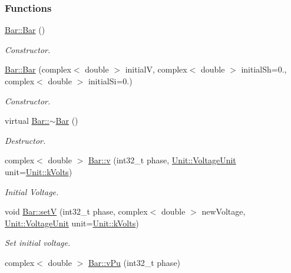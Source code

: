\subsubsection*{Functions}
\begin{DoxyCompactItemize}
\item 
\hyperlink{group___models_ga9cae2188fcc6cce41caa7898c64548d1}{Bar\+::\+Bar} ()
\begin{DoxyCompactList}\small\item\em Constructor. \end{DoxyCompactList}\item 
\hyperlink{group___models_gab1c5a81ad40dbc7ee745077b4f5c20d4}{Bar\+::\+Bar} (complex$<$ double $>$ initial\+V, complex$<$ double $>$ initial\+Sh=0., complex$<$ double $>$ initial\+Si=0.)
\begin{DoxyCompactList}\small\item\em Constructor. \end{DoxyCompactList}\item 
virtual \hyperlink{group___models_ga9c7ebea0c189423591741ac438985316}{Bar\+::$\sim$\+Bar} ()
\begin{DoxyCompactList}\small\item\em Destructor. \end{DoxyCompactList}\item 
complex$<$ double $>$ \hyperlink{group___models_ga1e6f2daec86407118656d88170d1adc2}{Bar\+::v} (int32\+\_\+t phase, \hyperlink{class_unit_a55b07dfa9457e1eca2c7194fe0cfc3c1}{Unit\+::\+Voltage\+Unit} unit=\hyperlink{class_unit_a55b07dfa9457e1eca2c7194fe0cfc3c1aa54b2473993a702a3923525765bd6e4c}{Unit\+::k\+Volts})
\begin{DoxyCompactList}\small\item\em Initial Voltage. \end{DoxyCompactList}\item 
void \hyperlink{group___models_ga9b6fbc92674bfcdc9d5090795ab335a6}{Bar\+::set\+V} (int32\+\_\+t phase, complex$<$ double $>$ new\+Voltage, \hyperlink{class_unit_a55b07dfa9457e1eca2c7194fe0cfc3c1}{Unit\+::\+Voltage\+Unit} unit=\hyperlink{class_unit_a55b07dfa9457e1eca2c7194fe0cfc3c1aa54b2473993a702a3923525765bd6e4c}{Unit\+::k\+Volts})
\begin{DoxyCompactList}\small\item\em Set initial voltage. \end{DoxyCompactList}\item 
complex$<$ double $>$ \hyperlink{group___models_ga1c54bd76b2f620d970ddfed8cdae4116}{Bar\+::v\+Pu} (int32\+\_\+t phase)

\end{DoxyCompactItemize}

